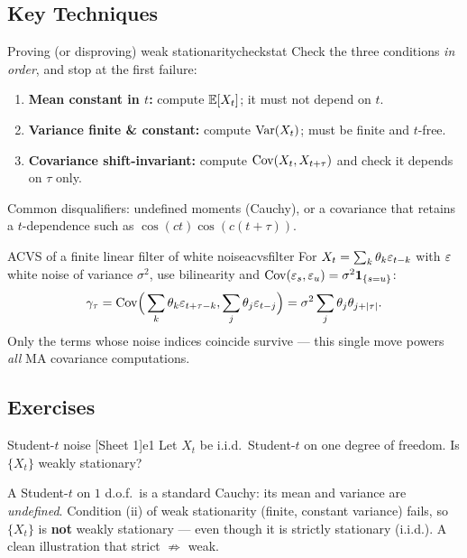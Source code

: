 \subsection{Key Techniques}

\begin{keytech}{Proving (or disproving) weak stationarity}{checkstat}
Check the three conditions \emph{in order}, and stop at the first failure:
\begin{enumerate}
  \item \textbf{Mean constant in $t$:} compute $\mathbb{E}[X_t]$; it must not depend on $t$.
  \item \textbf{Variance finite \& constant:} compute $\operatorname{Var}(X_t)$; must be
        finite and $t$-free.
  \item \textbf{Covariance shift-invariant:} compute $\operatorname{Cov}(X_t,X_{t+\tau})$ and
        check it depends on $\tau$ only.
\end{enumerate}
Common disqualifiers: undefined moments (Cauchy), or a covariance that retains
a $t$-dependence such as $\cos(ct)\cos(c(t+\tau))$.
\end{keytech}

\begin{keytech}{ACVS of a finite linear filter of white noise}{acvsfilter}
For $X_t=\sum_k\theta_k\varepsilon_{t-k}$ with $\varepsilon$ white noise of variance
$\sigma^2$, use bilinearity and $\operatorname{Cov}(\varepsilon_s,\varepsilon_u)=\sigma^2\mathbf{1}_{\{s=u\}}$:
\[
\gamma_\tau=\operatorname{Cov}\!\Big(\sum_k\theta_k\varepsilon_{t+\tau-k},\sum_j\theta_j\varepsilon_{t-j}\Big)
=\sigma^2\sum_{j}\theta_j\theta_{j+\left\lvert \tau \right\rvert}.
\]
Only the terms whose noise indices coincide survive --- this single move powers
\emph{all} MA covariance computations.
\end{keytech}

\subsection{Exercises}

\begin{exercise}{Student-$t$ noise \quad\textnormal{[Sheet 1]}}{e1}
Let $X_t$ be i.i.d.\ Student-$t$ on one degree of freedom. Is $\{X_t\}$ weakly
stationary?
\end{exercise}
\begin{solution}
A Student-$t$ on $1$ d.o.f.\ is a standard Cauchy: its mean and variance are
\emph{undefined}. Condition (ii) of weak stationarity (finite, constant
variance) fails, so $\{X_t\}$ is \textbf{not} weakly stationary --- even though
it is strictly stationary (i.i.d.). A clean illustration that strict
$\not\Rightarrow$ weak.
\end{solution}

